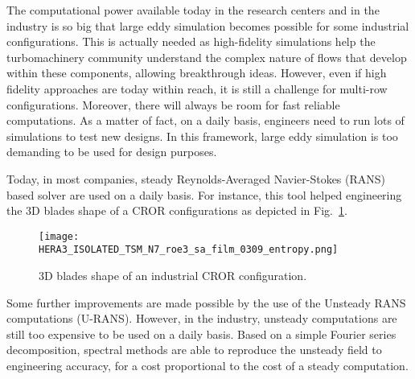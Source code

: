 
The computational power available today in
the research centers and in the industry
is so big that large eddy simulation
becomes possible for some industrial configurations.
This is actually needed as high-fidelity
simulations help the turbomachinery community understand
the complex nature of flows that develop 
within these components,
allowing breakthrough ideas.
However, even if high fidelity approaches
are today within reach, it is still a challenge for
multi-row configurations.
Moreover, there will always be room for fast reliable
computations. 
As a matter of fact, on a daily basis, engineers need
to run lots of simulations to test new designs.
In this framework, large eddy simulation is
too demanding to be used for design purposes.

Today, in most companies, steady Reynolds-Averaged
Navier-Stokes (RANS) based solver are used on a daily basis.
For instance, this tool 
helped engineering the $3$D blades shape of a CROR
configurations as depicted in Fig.~\ref{fig:sm_leap}.
\begin{figure}[htbp]
  \centering
  \texttt{[image: HERA3\_ISOLATED\_TSM\_N7\_roe3\_sa\_film\_0309\_entropy.png]}
  \caption{$3$D blades shape of an industrial CROR configuration.}
  \label{fig:sm_leap}
\end{figure}
Some further improvements are made possible by the use
of the Unsteady RANS computations (U-RANS).
However, in the industry, unsteady computations
are still too expensive to be used on a daily basis.
Based on a simple Fourier series decomposition, spectral methods are 
able to reproduce the unsteady field to engineering
accuracy, for a cost proportional to the cost of a
steady computation.

